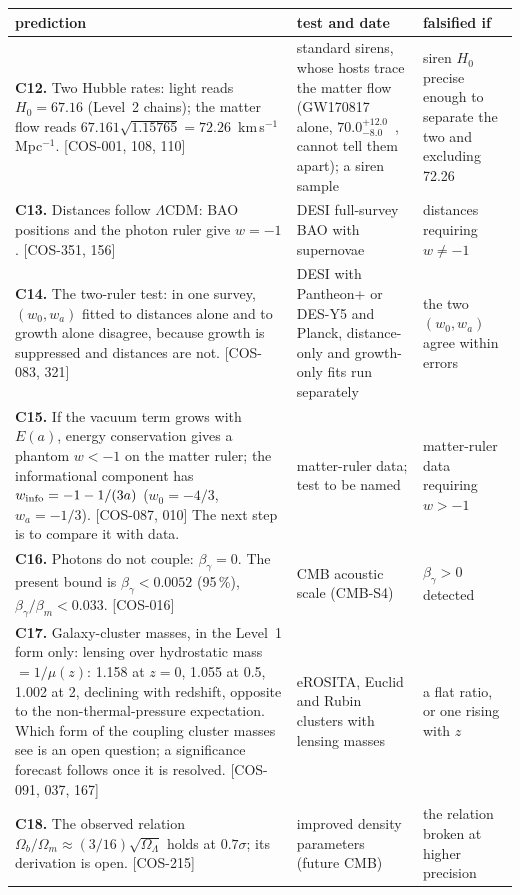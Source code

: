 {\small\begin{longtable}{@{}>{\raggedright\arraybackslash}p{}>{\raggedright\arraybackslash}p{}>{\raggedright\arraybackslash}p{}@{}}
\toprule
prediction & test and date & falsified if \\\midrule\endhead
\textbf{C12.} \Spending{} Two Hubble rates: light reads $H_0=67.16$ (Level~2 chains); the matter flow reads $67.161\sqrt{1.15765}=72.26$~km\,s$^{-1}$\,Mpc$^{-1}$.
 [COS-001, 108, 110]
 & standard sirens, whose hosts trace the matter flow (GW170817 alone, $70.0^{+12.0}_{-8.0}$~\cite{Abbott2017Siren}, cannot tell them apart); a siren sample
 & siren $H_0$ precise enough to separate the two and excluding 72.26 \\ \cmidrule{1-3}
\textbf{C13.} \Spending{} Distances follow $\Lambda$CDM: BAO positions and the photon ruler give $w=-1$. [COS-351, 156]
 & DESI full-survey BAO with supernovae
 & distances requiring $w\ne-1$ \\ \cmidrule{1-3}
\textbf{C14.} \Spending{} The two-ruler test: in one survey, $(w_0,w_a)$ fitted to distances alone and to growth alone disagree, because growth is suppressed
 and distances are not. [COS-083, 321]
 & DESI with Pantheon+ or DES-Y5 and Planck, distance-only and growth-only fits run separately
 & the two $(w_0,w_a)$ agree within errors \\ \cmidrule{1-3}
\textbf{C15.} \Spending{} If the vacuum term grows with $E(a)$, energy conservation gives a phantom $w<-1$ on the matter ruler; the informational component has
 $w_{\rm info}=-1-1/(3a)$ ($w_0=-4/3$, $w_a=-1/3$). [COS-087, 010] \openprob{} The next step is to compare it with data.
 & matter-ruler data; test to be named
 & matter-ruler data requiring $w>-1$ \\ \cmidrule{1-3}
\textbf{C16.} \Spassed{} Photons do not couple: $\beta_\gamma=0$. The present bound is $\beta_\gamma<0.0052$ (95\,\%), $\beta_\gamma/\beta_m<0.033$. [COS-016]
 & CMB acoustic scale (CMB-S4)
 & $\beta_\gamma>0$ detected \\ \cmidrule{1-3}
\textbf{C17.} \Spending{} Galaxy-cluster masses, in the Level~1 form only: lensing over hydrostatic mass $=1/\mu(z)$: 1.158 at $z=0$, 1.055 at 0.5, 1.002 at 2,
 declining with redshift, opposite to the non-thermal-pressure expectation. Which form of the coupling cluster masses see is an open question; a significance forecast follows once it is resolved. \openprob{} [COS-091, 037, 167]
 & eROSITA, Euclid and Rubin clusters with lensing masses
 & a flat ratio, or one rising with $z$ \\ \cmidrule{1-3}
\textbf{C18.} \Sprecision{} The observed relation $\Omega_b/\Omega_m\approx(3/16)\sqrt{\Omega_\Lambda}$ holds at $0.7\sigma$; its derivation is open. [COS-215]
 & improved density parameters (future CMB)
 & the relation broken at higher precision \\
\bottomrule
\end{longtable}}

